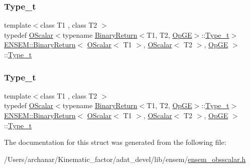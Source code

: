 \subsubsection{\texorpdfstring{Type\_t}{Type\_t}\hspace{0.1cm}{\footnotesize\ttfamily [1/2]}}
{\footnotesize\ttfamily template$<$class T1 , class T2 $>$ \\
typedef \mbox{\hyperlink{classENSEM_1_1OScalar}{O\+Scalar}}$<$typename \mbox{\hyperlink{structENSEM_1_1BinaryReturn}{Binary\+Return}}$<$T1, T2, \mbox{\hyperlink{structENSEM_1_1OpGE}{Op\+GE}}$>$\+::\mbox{\hyperlink{structENSEM_1_1BinaryReturn_3_01OScalar_3_01T1_01_4_00_01OScalar_3_01T2_01_4_00_01OpGE_01_4_abf5aa98967250f1ae5173d497d544c12}{Type\+\_\+t}}$>$ \mbox{\hyperlink{structENSEM_1_1BinaryReturn}{E\+N\+S\+E\+M\+::\+Binary\+Return}}$<$ \mbox{\hyperlink{classENSEM_1_1OScalar}{O\+Scalar}}$<$ T1 $>$, \mbox{\hyperlink{classENSEM_1_1OScalar}{O\+Scalar}}$<$ T2 $>$, \mbox{\hyperlink{structENSEM_1_1OpGE}{Op\+GE}} $>$\+::\mbox{\hyperlink{structENSEM_1_1BinaryReturn_3_01OScalar_3_01T1_01_4_00_01OScalar_3_01T2_01_4_00_01OpGE_01_4_abf5aa98967250f1ae5173d497d544c12}{Type\+\_\+t}}}

\mbox{\label{structENSEM_1_1BinaryReturn_3_01OScalar_3_01T1_01_4_00_01OScalar_3_01T2_01_4_00_01OpGE_01_4_abf5aa98967250f1ae5173d497d544c12}} 
\subsubsection{\texorpdfstring{Type\_t}{Type\_t}\hspace{0.1cm}{\footnotesize\ttfamily [2/2]}}
{\footnotesize\ttfamily template$<$class T1 , class T2 $>$ \\
typedef \mbox{\hyperlink{classENSEM_1_1OScalar}{O\+Scalar}}$<$typename \mbox{\hyperlink{structENSEM_1_1BinaryReturn}{Binary\+Return}}$<$T1, T2, \mbox{\hyperlink{structENSEM_1_1OpGE}{Op\+GE}}$>$\+::\mbox{\hyperlink{structENSEM_1_1BinaryReturn_3_01OScalar_3_01T1_01_4_00_01OScalar_3_01T2_01_4_00_01OpGE_01_4_abf5aa98967250f1ae5173d497d544c12}{Type\+\_\+t}}$>$ \mbox{\hyperlink{structENSEM_1_1BinaryReturn}{E\+N\+S\+E\+M\+::\+Binary\+Return}}$<$ \mbox{\hyperlink{classENSEM_1_1OScalar}{O\+Scalar}}$<$ T1 $>$, \mbox{\hyperlink{classENSEM_1_1OScalar}{O\+Scalar}}$<$ T2 $>$, \mbox{\hyperlink{structENSEM_1_1OpGE}{Op\+GE}} $>$\+::\mbox{\hyperlink{structENSEM_1_1BinaryReturn_3_01OScalar_3_01T1_01_4_00_01OScalar_3_01T2_01_4_00_01OpGE_01_4_abf5aa98967250f1ae5173d497d544c12}{Type\+\_\+t}}}



The documentation for this struct was generated from the following file\+:\begin{DoxyCompactItemize}
\item 
/\+Users/archanar/\+Kinematic\+\_\+factor/adat\+\_\+devel/lib/ensem/\mbox{\hyperlink{lib_2ensem_2ensem__obsscalar_8h}{ensem\+\_\+obsscalar.\+h}}\end{DoxyCompactItemize}
